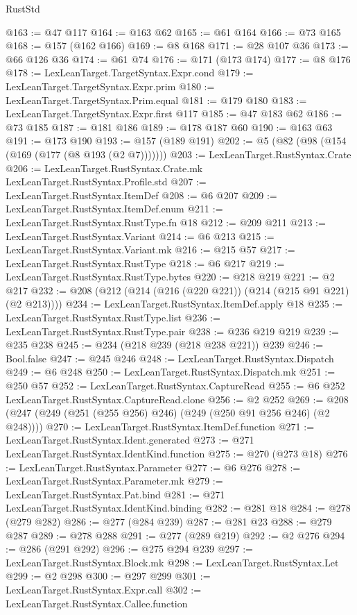 \begin{lexlean}{RustStd}
\begin{coremodule}
{\begin{coremodule}
{{{{{{{{{{@163 := @47 @117
@164 := @163 @62
@165 := @61 @164
@166 := @73 @165
@168 := @157 (@162 @166)
@169 := @8 @168
@171 := @28 @107 @36
@173 := @66 @126 @36
@174 := @61 @74
@176 := @171 (@173 @174)
@177 := @8 @176
@178 := LexLeanTarget.TargetSyntax.Expr.cond
@179 := LexLeanTarget.TargetSyntax.Expr.prim
@180 := LexLeanTarget.TargetSyntax.Prim.equal
@181 := @179 @180
@183 := LexLeanTarget.TargetSyntax.Expr.first @117
@185 := @47 @183 @62
@186 := @73 @185
@187 := @181 @186
@189 := @178 @187 @60
@190 := @163 @63
@191 := @173 @190
@193 := @157 (@189 @191)
@202 := @5 (@82 (@98 (@154 (@169 (@177 (@8 @193 (@2 @7)))))))
@203 := LexLeanTarget.RustSyntax.Crate
@206 := LexLeanTarget.RustSyntax.Crate.mk LexLeanTarget.RustSyntax.Profile.std
@207 := LexLeanTarget.RustSyntax.ItemDef
@208 := @6 @207
@209 := LexLeanTarget.RustSyntax.ItemDef.enum
@211 := LexLeanTarget.RustSyntax.RustType.fn @18
@212 := @209 @211
@213 := LexLeanTarget.RustSyntax.Variant
@214 := @6 @213
@215 := LexLeanTarget.RustSyntax.Variant.mk
@216 := @215 @57
@217 := LexLeanTarget.RustSyntax.RustType
@218 := @6 @217
@219 := LexLeanTarget.RustSyntax.RustType.bytes
@220 := @218 @219
@221 := @2 @217
@232 := @208 (@212 (@214 (@216 (@220 @221)) (@214 (@215 @91 @221) (@2 @213))))
@234 := LexLeanTarget.RustSyntax.ItemDef.apply @18
@235 := LexLeanTarget.RustSyntax.RustType.list
@236 := LexLeanTarget.RustSyntax.RustType.pair
@238 := @236 @219 @219
@239 := @235 @238
@245 := @234 (@218 @239 (@218 @238 @221)) @239
@246 := Bool.false
@247 := @245 @246
@248 := LexLeanTarget.RustSyntax.Dispatch
@249 := @6 @248
@250 := LexLeanTarget.RustSyntax.Dispatch.mk
@251 := @250 @57
@252 := LexLeanTarget.RustSyntax.CaptureRead
@255 := @6 @252 LexLeanTarget.RustSyntax.CaptureRead.clone
@256 := @2 @252
@269 := @208 (@247 (@249 (@251 (@255 @256) @246) (@249 (@250 @91 @256 @246) (@2 @248))))
@270 := LexLeanTarget.RustSyntax.ItemDef.function
@271 := LexLeanTarget.RustSyntax.Ident.generated
@273 := @271 LexLeanTarget.RustSyntax.IdentKind.function
@275 := @270 (@273 @18)
@276 := LexLeanTarget.RustSyntax.Parameter
@277 := @6 @276
@278 := LexLeanTarget.RustSyntax.Parameter.mk
@279 := LexLeanTarget.RustSyntax.Pat.bind
@281 := @271 LexLeanTarget.RustSyntax.IdentKind.binding
@282 := @281 @18
@284 := @278 (@279 @282)
@286 := @277 (@284 @239)
@287 := @281 @23
@288 := @279 @287
@289 := @278 @288
@291 := @277 (@289 @219)
@292 := @2 @276
@294 := @286 (@291 @292)
@296 := @275 @294 @239
@297 := LexLeanTarget.RustSyntax.Block.mk
@298 := LexLeanTarget.RustSyntax.Let
@299 := @2 @298
@300 := @297 @299
@301 := LexLeanTarget.RustSyntax.Expr.call
@302 := LexLeanTarget.RustSyntax.Callee.function
}}}}}}}}}}
\end{coremodule}}
\end{coremodule}
\end{lexlean}
